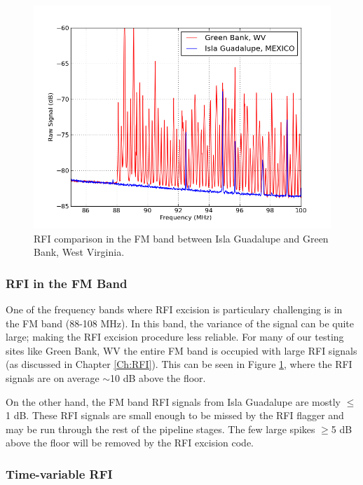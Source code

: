 \begin{figure}[htb]
\begin{center}
\includegraphics[width=0.9\linewidth]{Data_analysis/figures/FM_band_comp.png}
\caption{RFI comparison in the FM band between Isla Guadalupe and Green Bank, West Virginia. }
\label{Fig:FM_band}
\end{center}
\end{figure}

\subsubsection{RFI in the FM Band}

One of the frequency bands where RFI excision is particulary challenging is in the FM band (88-108 MHz). In this band, the variance of the signal can be quite large; making the RFI excision procedure less reliable. For many of our testing sites like Green Bank, WV the entire FM band is occupied with large RFI signals (as discussed in Chapter \ref{Ch:RFI}). This can be seen in Figure \ref{Fig:FM_band}, where the RFI signals are on average $\sim$10 dB above the floor. 

On the other hand, the FM band RFI signals from Isla Guadalupe are mostly $\leq$1 dB. These RFI signals are small enough to be missed by the RFI flagger and may be run through the rest of the pipeline stages. The few large spikes $\geq$5 dB above the floor will be removed by the RFI excision code. 

\subsubsection{Time-variable RFI}

